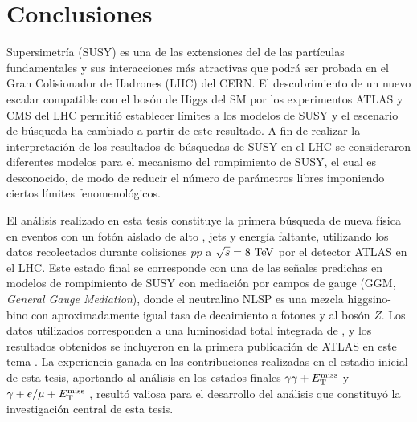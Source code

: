 \chapter{Conclusiones}\label{cap:conclusiones}

Supersimetría (SUSY) es una de las extensiones del {\SM} de las partículas
fundamentales y sus interacciones más atractivas que podrá ser probada en el
Gran Colisionador de Hadrones (LHC) del CERN. El descubrimiento de un nuevo
escalar compatible con el bosón de Higgs del SM por los experimentos ATLAS
\cite{Aad:2012tfa} y CMS del LHC permitió establecer límites a los modelos de SUSY y el
escenario de búsqueda ha cambiado a partir de este resultado. A fin de realizar
la interpretación de los resultados de búsquedas de SUSY en el LHC se
consideraron diferentes modelos para el mecanismo del rompimiento de SUSY, el
cual es desconocido, de modo de reducir el número de parámetros libres
imponiendo ciertos límites fenomenológicos.

El análisis realizado en esta tesis constituye la primera búsqueda de nueva
física en eventos con un fotón aislado de alto {\pt}, jets y energía faltante,
utilizando los datos recolectados durante colisiones $pp$ a $\sqrt{s}=8 \tev$
por el detector ATLAS en el LHC. Este estado final se corresponde con una de las se\~nales
predichas en modelos de rompimiento de SUSY con mediación por campos de gauge (GGM, \emph{General Gauge
  Mediation}), donde el neutralino NLSP es una mezcla higgsino-bino con
aproximadamente igual tasa de decaimiento a fotones y al bosón $Z$. Los datos
utilizados corresponden a una luminosidad total integrada de {\ilumi}, y los
resultados obtenidos se incluyeron en la primera publicación de ATLAS en este
tema \cite{Aad:2015hea}. La experiencia ganada en las contribuciones realizadas
en el estadio inicial de esta tesis, aportando al análisis en los estados
finales $\gamma\gamma+E_{\mathrm{T}}^{\mathrm{miss}}$ \cite{Aad2012519,ATLAS-CONF-2014-001} y
$\gamma+e/\mu+E_{\mathrm{T}}^{\mathrm{miss}}$ \cite{ATLAS-CONF-2012-144}, resultó valiosa para el
desarrollo del análisis que constituyó la investigación central de esta tesis.



